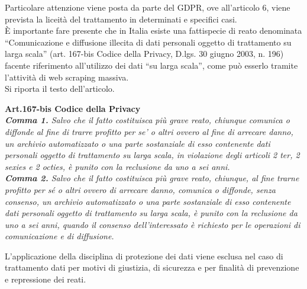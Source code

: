 Particolare attenzione viene posta da parte del GDPR, ove all'articolo 6, viene prevista la liceit\`a del trattamento in determinati e specifici casi. \\
\`E importante fare presente che in Italia esiste una fattispecie di reato denominata ``Comunicazione e diffusione illecita di dati personali oggetto di trattamento su larga scala'' (art. 167-bis Codice della Privacy, D.lgs. 30 giugno 2003, n. 196) facente riferimento all'utilizzo dei dati ``su larga scala'', come pu\`o esserlo tramite l'attivit\`a di web scraping massiva.\\
Si riporta il testo dell'articolo.\\
\newpage

\begin{center}
    \textbf{Art.167-bis Codice della Privacy}\\
\textit{\textbf{Comma 1.} Salvo che il fatto costituisca più grave reato, chiunque comunica o diffonde al fine di trarre profitto per se' o altri ovvero al fine di arrecare danno, un archivio automatizzato o una parte sostanziale di esso contenente dati personali oggetto di trattamento su larga scala, in violazione degli articoli 2 ter, 2 sexies e 2 octies, è punito con la reclusione da uno a sei anni.\\
\textbf{Comma 2.} Salvo che il fatto costituisca più grave reato, chiunque, al fine trarne profitto per sé o altri ovvero di arrecare danno, comunica o diffonde, senza consenso, un archivio automatizzato o una parte sostanziale di esso contenente dati personali oggetto di trattamento su larga scala, è punito con la reclusione da uno a sei anni, quando il consenso dell'interessato è richiesto per le operazioni di comunicazione e di diffusione.}
\end{center}
L'applicazione della disciplina di protezione dei dati viene esclusa nel caso di trattamento dati per motivi di giustizia, di sicurezza e per finalità di prevenzione e repressione dei reati.
